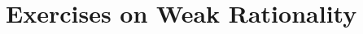 \documentclass[\main/main.tex]{subfiles}
\begin{document}
\section{Exercises on Weak Rationality}

\end{document}

